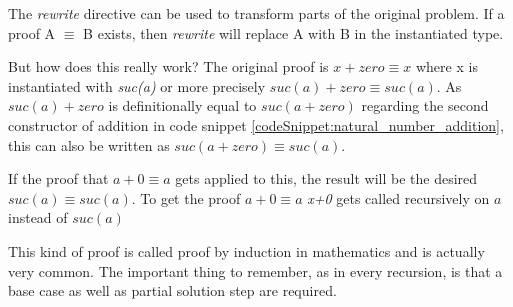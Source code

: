 The \emph{rewrite} directive can be used to transform parts of the original problem. If a proof A $\equiv$ B exists, then \emph{rewrite} will replace A with B in the instantiated type.

But how does this really work?
The original proof is $x + zero \equiv x$ where x is instantiated with \emph{suc(a)} or more precisely $suc(a) + zero \equiv suc(a)$.
As $suc(a) + zero$ is definitionally equal to $suc(a + zero)$ regarding the second constructor of addition in code snippet \ref{codeSnippet:natural_number_addition}, this can also be written as $suc(a + zero) \equiv suc(a)$.

If the proof that $a + 0 \equiv a$ gets applied to this, the result will be the desired $suc(a) \equiv suc(a)$. 
To get the proof $a + 0 \equiv a$ \emph{x+0} gets called recursively on $a$ instead of $suc(a)$

This kind of proof is called proof by induction in mathematics and is actually very common.
The important thing to remember, as in every recursion, is that a base case as well as partial solution step are required.